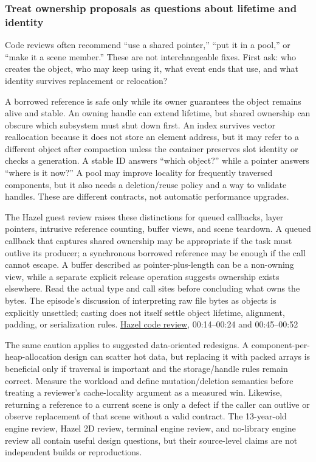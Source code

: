 \subsubsection{Treat ownership proposals as questions about lifetime and identity}\label{05-engine-i-ch014-treat-ownership-proposals-as-questions-about-lifetime-and-identity}

Code reviews often recommend ``use a shared pointer,'' ``put it in a pool,'' or ``make it a scene member.'' These are not interchangeable fixes. First ask: who creates the object, who may keep using it, what event ends that use, and what identity survives replacement or relocation?

A borrowed reference is safe only while its owner guarantees the object remains alive and stable. An owning handle can extend lifetime, but shared ownership can obscure which subsystem must shut down first. An index survives vector reallocation because it does not store an element address, but it may refer to a different object after compaction unless the container preserves slot identity or checks a generation. A stable ID answers ``which object?'' while a pointer answers ``where is it now?'' A pool may improve locality for frequently traversed components, but it also needs a deletion/reuse policy and a way to validate handles. These are different contracts, not automatic performance upgrades.

The Hazel guest review raises these distinctions for queued callbacks, layer pointers, intrusive reference counting, buffer views, and scene teardown. A queued callback that captures shared ownership may be appropriate if the task must outlive its producer; a synchronous borrowed reference may be enough if the call cannot escape. A buffer described as pointer-plus-length can be a non-owning view, while a separate explicit release operation suggests ownership exists elsewhere. Read the actual type and call sites before concluding what owns the bytes. The episode's discussion of interpreting raw file bytes as objects is explicitly unsettled; casting does not itself settle object lifetime, alignment, padding, or serialization rules. \href{https://www.youtube.com/watch?v=Glq1oDBy1cQ}{Hazel code review}, 00:14--00:24 and 00:45--00:52

The same caution applies to suggested data-oriented redesigns. A component-per-heap-allocation design can scatter hot data, but replacing it with packed arrays is beneficial only if traversal is important and the storage/handle rules remain correct. Measure the workload and define mutation/deletion semantics before treating a reviewer's cache-locality argument as a measured win. Likewise, returning a reference to a current scene is only a defect if the caller can outlive or observe replacement of that scene without a valid contract. The 13-year-old engine review, Hazel 2D review, terminal engine review, and no-library engine review all contain useful design questions, but their source-level claims are not independent builds or reproductions.


